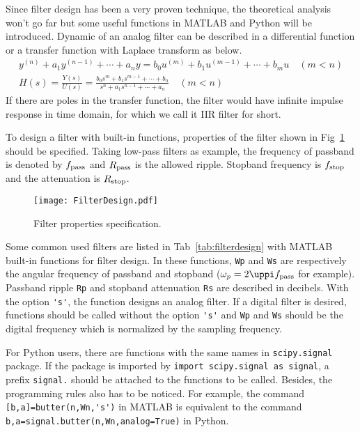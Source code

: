Since filter design has been a very proven technique, the theoretical analysis won't go far but some useful functions in MATLAB and Python will be introduced. Dynamic of an analog filter can be described in a differential function or a transfer function with Laplace transform as below.
\begin{gather}
    y^{(n)} + a_1 y^{(n-1)} + \cdots + a_n y = b_0 u^{(m)} + b_1 u^{(m-1)} + \cdots + b_m u \quad (m < n) \\
    H(s) = \frac{Y(s)}{U(s)} = \frac{b_0 s^{m} + b_1 s^{m-1} + \cdots + b_n}{s^{n} + a_1 s^{n-1} + \cdots + a_n} \quad (m < n)
\end{gather}
If there are poles in the transfer function, the filter would have infinite impulse response in time domain, for which we call it IIR filter for short.


To design a filter with built-in functions, properties of the filter shown in Fig~\ref{fig:filterdesign} should be specified. Taking low-pass filters as example, the frequency of passband is denoted by $f_{\rm pass}$ and $R_{\rm pass}$ is the allowed ripple. Stopband frequency is $f_{\rm stop}$ and the attenuation is $R_{\rm stop}$.


\begin{figure}[!htb]
    \centering
    \texttt{[image: FilterDesign.pdf]}
    \caption{Filter properties specification.}
    \label{fig:filterdesign}
\end{figure}


Some common used filters are listed in Tab~\ref{tab:filterdesign} with MATLAB built-in functions for filter design. In these functions, \verb|Wp| and \verb|Ws| are respectively the angular frequency of passband and stopband ($\omega_p = 2 \uppi f_{\rm pass}$ for example). Passband ripple \verb|Rp| and stopband attenuation \verb|Rs| are described in decibels. With the option \verb|'s'|, the function designs an analog filter. If a digital filter is desired, functions should be called without the option \verb|'s'| and \verb|Wp| and \verb|Ws| should be the digital frequency which is normalized by the sampling frequency.


For Python users, there are functions with the same names in \verb|scipy.signal| package. If the package is imported by \verb|import scipy.signal as signal|, a prefix \verb|signal.| should be attached to the functions to be called. Besides, the programming rules also has to be noticed. For example, the command \verb|[b,a]=butter(n,Wn,'s')| in MATLAB is equivalent to the command \verb|b,a=signal.butter(n,Wn,analog=True)| in Python.


